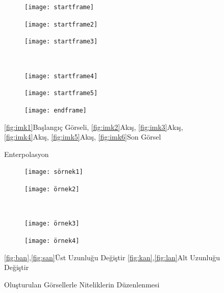 \documentclass[12pt, a4paper]{article}
\begin{document}
	\begin{figure}[htbp]
		\centering
		\begin{subfigure}{0.18\textwidth}
			\centering
			\texttt{[image: startframe]}
			\caption{}
			\label{fig:imk1}
		\end{subfigure}
		\hfill
		\begin{subfigure}{0.18\textwidth}
			\centering
			\texttt{[image: startframe2]}
			\caption{}
			\label{fig:imk2}
		\end{subfigure}
		\hfill
		\begin{subfigure}{0.18\textwidth}
			\centering
			\texttt{[image: startframe3]}
			\caption{}
			\label{fig:imk3}
		\end{subfigure}
		\\
		\begin{subfigure}{0.18\textwidth}
			\centering
			\texttt{[image: startframe4]}
			\caption{}
			\label{fig:imk4}
		\end{subfigure}
		\hfill
		\begin{subfigure}{0.18\textwidth}
			\centering
			\texttt{[image: startframe5]}
			\caption{}
			\label{fig:imk5}
		\end{subfigure}
		\hfill
		\begin{subfigure}{0.18\textwidth}
			\centering
			\texttt{[image: endframe]}
			\caption{}
			\label{fig:imk6}
		\end{subfigure}
		\caption{Enterpolasyon\cite{fu2022styleganhuman}}
		\label{fig:ssix_images}
		\eqref{fig:imk1}Başlangıç Görseli,
		\eqref{fig:imk2}Akış,
		\eqref{fig:imk3}Akış,
		\eqref{fig:imk4}Akış,
		\eqref{fig:imk5}Akış,
		\eqref{fig:imk6}Son Görsel
	\end{figure}
	\FloatBarrier
	\clearpage
	\begin{figure}[htbp]
		\centering
		\begin{subfigure}{0.35\textwidth}
			\centering
			\texttt{[image: sörnek1]}
			\caption{}
			\label{fig:ban}
		\end{subfigure}
		\hfill
		\begin{subfigure}{0.35\textwidth}
			\centering
			\texttt{[image: örnek2]}
			\caption{}
			\label{fig:san}
		\end{subfigure}
		\\
		\begin{subfigure}{0.35\textwidth}
			\centering
			\texttt{[image: örnek3]}
			\caption{}
			\label{fig:kan}
		\end{subfigure}
		\hfill
		\begin{subfigure}{0.35\textwidth}
			\centering
			\texttt{[image: örnek4]}
			\caption{}
			\label{fig:lan}
		\end{subfigure}
		\caption{Oluşturulan Görsellerle Niteliklerin Düzenlenmesi\cite{fu2022styleganhuman}}
		\eqref{fig:ban},\eqref{fig:san}Üst Uzunluğu Değiştir
		\eqref{fig:kan},\eqref{fig:lan}Alt Uzunluğu Değiştir
	\end{figure}
	\FloatBarrier
\end{document}
